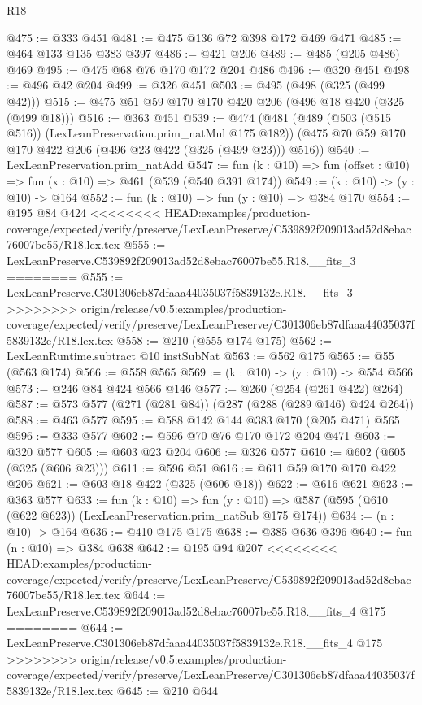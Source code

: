 \begin{lexlean}{R18}
\begin{coremodule}
{{{{{{{{{{{{{@475 := @333 @451
@481 := @475 @136 @72 @398 @172 @469 @471
@485 := @464 @133 @135 @383 @397
@486 := @421 @206
@489 := @485 (@205 @486) @469
@495 := @475 @68 @76 @170 @172 @204 @486
@496 := @320 @451
@498 := @496 @42 @204
@499 := @326 @451
@503 := @495 (@498 (@325 (@499 @42)))
@515 := @475 @51 @59 @170 @170 @420 @206 (@496 @18 @420 (@325 (@499 @18)))
@516 := @363 @451
@539 := @474
    (@481
      (@489 (@503 (@515 @516)) (LexLeanPreservation.prim_natMul @175 @182))
      (@475 @70 @59 @170 @170 @422 @206 (@496 @23 @422 (@325 (@499 @23))) @516))
@540 := LexLeanPreservation.prim_natAdd
@547 := fun (k : @10) => fun (offset : @10) => fun (x : @10) => @461 (@539 (@540 @391 @174))
@549 := (k : @10) -> (y : @10) -> @164
@552 := fun (k : @10) => fun (y : @10) => @384 @170
@554 := @195 @84 @424
<<<<<<<< HEAD:examples/production-coverage/expected/verify/preserve/LexLeanPreserve/C539892f209013ad52d8ebac76007be55/R18.lex.tex
@555 := LexLeanPreserve.C539892f209013ad52d8ebac76007be55.R18.__fits_3
========
@555 := LexLeanPreserve.C301306eb87dfaaa44035037f5839132e.R18.__fits_3
>>>>>>>> origin/release/v0.5:examples/production-coverage/expected/verify/preserve/LexLeanPreserve/C301306eb87dfaaa44035037f5839132e/R18.lex.tex
@558 := @210 (@555 @174 @175)
@562 := LexLeanRuntime.subtract @10 instSubNat
@563 := @562 @175
@565 := @55 (@563 @174)
@566 := @558 @565
@569 := (k : @10) -> (y : @10) -> @554 @566
@573 := @246 @84 @424 @566 @146
@577 := @260 (@254 (@261 @422) @264)
@587 := @573 @577 (@271 (@281 @84)) (@287 (@288 (@289 @146) @424 @264))
@588 := @463 @577
@595 := @588 @142 @144 @383 @170 (@205 @471) @565
@596 := @333 @577
@602 := @596 @70 @76 @170 @172 @204 @471
@603 := @320 @577
@605 := @603 @23 @204
@606 := @326 @577
@610 := @602 (@605 (@325 (@606 @23)))
@611 := @596 @51
@616 := @611 @59 @170 @170 @422 @206
@621 := @603 @18 @422 (@325 (@606 @18))
@622 := @616 @621
@623 := @363 @577
@633 := fun (k : @10) =>
  fun (y : @10) => @587 (@595 (@610 (@622 @623)) (LexLeanPreservation.prim_natSub @175 @174))
@634 := (n : @10) -> @164
@636 := @410 @175 @175
@638 := @385 @636 @396
@640 := fun (n : @10) => @384 @638
@642 := @195 @94 @207
<<<<<<<< HEAD:examples/production-coverage/expected/verify/preserve/LexLeanPreserve/C539892f209013ad52d8ebac76007be55/R18.lex.tex
@644 := LexLeanPreserve.C539892f209013ad52d8ebac76007be55.R18.__fits_4 @175
========
@644 := LexLeanPreserve.C301306eb87dfaaa44035037f5839132e.R18.__fits_4 @175
>>>>>>>> origin/release/v0.5:examples/production-coverage/expected/verify/preserve/LexLeanPreserve/C301306eb87dfaaa44035037f5839132e/R18.lex.tex
@645 := @210 @644
}}}}}}}}}}}}}
\end{coremodule}
\end{lexlean}
